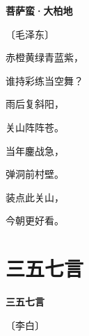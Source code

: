 \documentclass[12pt,UTF-8,openany,fontset=none]{ctexbook}
\begin{document}

\begin{center}
    {\bfseries 菩萨蛮·大柏地}

    \vspace{18pt}

    \begin{large}\xuwen
        〔毛泽东〕
    \end{large}

\end{center}

    \vspace{18pt}  %

\begin{center}
    \begin{Large}

        赤橙黄绿青蓝紫，

        谁持彩练当空舞？

        雨后复斜阳，

        关山阵阵苍。

        \vspace{18pt}  %

        当年鏖战急，

        弹洞前村壁。

        装点此关山，

        今朝更好看。

    \end{Large}

\end{center}

\vspace{8pt}
\clearpage

\section{三五七言}


\begin{center}
    {\bfseries 三五七言}

    \vspace{18pt}

    \begin{large}\xuwen
        〔李白〕
    \end{large}

\end{center}

    \vspace{18pt}  %
\end{document}
